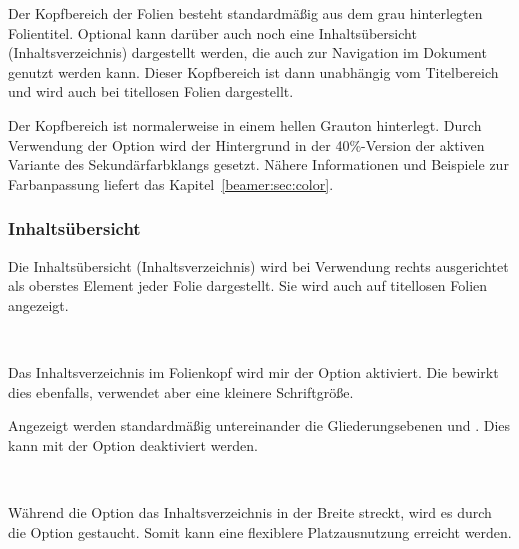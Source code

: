 Der Kopfbereich der Folien besteht standardmäßig aus dem grau hinterlegten
Folientitel. Optional kann darüber auch noch eine Inhaltsübersicht
(Inhaltsverzeichnis) dargestellt werden, 
die auch zur Navigation im Dokument genutzt werden kann.
Dieser Kopfbereich ist dann unabhängig vom Titelbereich und wird
auch bei titellosen Folien dargestellt.

\begin{Declaration}
\end{Declaration}

Der Kopfbereich ist normalerweise in einem hellen Grauton hinterlegt.
Durch Verwendung der Option  wird der Hintergrund
in der 40\%-Version der aktiven Variante des Sekundärfarbklangs gesetzt.
Nähere Informationen und Beispiele zur Farbanpassung liefert das
Kapitel~\ref{beamer:sec:color}.

\subsubsection{Inhaltsübersicht}

Die Inhaltsübersicht (Inhaltsverzeichnis) wird bei Verwendung rechts
ausgerichtet als oberstes Element jeder Folie dargestellt.
Sie wird auch auf titellosen Folien angezeigt.


\begin{Declaration}
  \\
\end{Declaration}

Das Inhaltsverzeichnis im Folienkopf
wird mir der Option  aktiviert.
Die  bewirkt dies ebenfalls,
verwendet aber eine kleinere Schriftgröße.

Angezeigt werden standardmäßig untereinander die Gliederungsebenen
 und . Dies kann mit der Option
 deaktiviert werden.


\begin{Declaration}
  \\
\end{Declaration}

Während die Option  das Inhaltsverzeichnis in der Breite
streckt, wird es durch die Option  gestaucht.
Somit kann eine flexiblere Platzausnutzung erreicht werden.

\begin{Declaration}
\end{Declaration}

